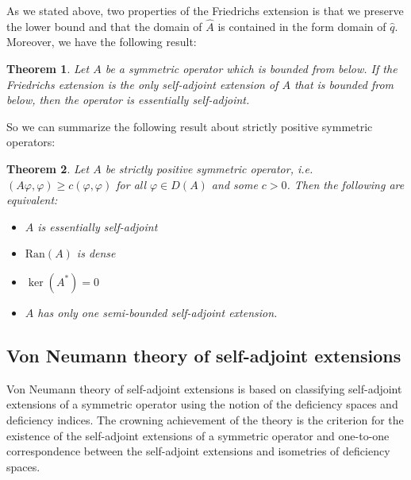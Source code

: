 \documentclass[11pt, a4paper, german]{article}
\theoremstyle{plain}
\newtheorem{theorem}{Theorem}
\theoremstyle{definition}
\theoremstyle{remark}
\numberwithin{equation}{section}
\numberwithin{theorem}{section}
\begin{document}
As we stated above, two properties of the Friedrichs extension is that we preserve the lower bound and that the domain of $\hat{A}$ is contained in the form domain of $\hat{q}$. Moreover, we have the following result:

\begin{theorem}
Let $A$ be a symmetric operator which is bounded from below. If the Friedrichs extension is the only self-adjoint extension of $A$ that is bounded from below, then the operator is essentially self-adjoint.
\end{theorem}

So we can summarize the following result about strictly positive symmetric operators:

\begin{theorem}

Let $A$ be strictly positive symmetric operator, i.e. $(A\varphi, \varphi) \geq c(\varphi, \varphi)$ for all $\varphi \in D(A)$ and some $c > 0$. Then the following are equivalent:

\begin{itemize}
\item $A$ is essentially self-adjoint
\item $\text{Ran}(A)$ is dense
\item $\ker	(A^*) = 0$
\item $A$ has only one semi-bounded self-adjoint extension.
\end{itemize}

\end{theorem}


\subsection{Von Neumann theory of self-adjoint extensions}

Von Neumann theory of self-adjoint extensions is based on classifying self-adjoint extensions of a symmetric operator using the notion of the deficiency spaces and deficiency indices. The crowning achievement of the theory is the criterion for the existence of the self-adjoint extensions of a symmetric operator and one-to-one correspondence between the self-adjoint extensions and isometries of deficiency spaces.
\end{document}
